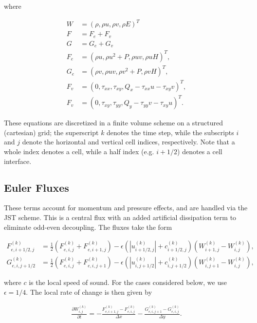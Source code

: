 \documentclass{article}
\begin{document}
where

\begin{equation}
\begin{aligned}
W &= (\rho, \rho u, \rho v, \rho E)^T \\
F &= F_e + F_v \\
G &= G_e + G_v \\
F_e &= (\rho u, \rho u^2 + P, \rho uv, \rho u H)^T, \\
G_e &= (\rho v, \rho uv, \rho v^2 + P, \rho v H)^T, \\
F_v &= (0, \tau_{xx}, \tau_{xy}, Q_x-\tau_{xx}u-\tau_{xy}v)^T, \\
F_v &= (0, \tau_{xy}, \tau_{yy}, Q_y-\tau_{yy}v-\tau_{xy}u)^T.
\end{aligned}
\end{equation}

These equations are discretized in a finite volume scheme on a structured (cartesian) grid; the superscript $k$ denotes the time step, while the subscripts $i$ and $j$ denote the horizontal and vertical cell indices, respectively. Note that a whole index denotes a cell, while a half index (e.g. $i+1/2$) denotes a cell interface.

\subsection{Euler Fluxes}
These terms account for momentum and pressure effects, and are handled via the JST scheme. This is a central flux with an added artificial dissipation term to eliminate odd-even decoupling. The fluxes take the form

\begin{equation}
\begin{aligned}
F_{e,i+1/2,j}^{(k)} &= \frac{1}{2}(F_{e,i,j}^{(k)}+F_{e,i+1,j}^{(k)}) - \epsilon(|u_{i+1/2,j}^{(k)}|+c_{i+1/2,j}^{(k)})(W_{i+1,j}^{(k)}-W_{i,j}^{(k)}), \\
G_{e,i,j+1/2}^{(k)} &= \frac{1}{2}(F_{e,i,j}^{(k)}+F_{e,i,j+1}^{(k)}) - \epsilon(|u_{i,j+1/2}^{(k)}|+c_{i,j+1/2}^{(k)})(W_{i,j+1}^{(k)}-W_{i,j}^{(k)}),
\end{aligned}
\end{equation}

where $c$ is the local speed of sound. For the cases considered below, we use $\epsilon = 1/4$. The local rate of change is then given by

\begin{equation}
\begin{aligned}
\frac{\partial W^{(k)}_{i,j}}{\partial t} = -\frac{F_{e,i+1,j}^{(k)}-F_{e,i,j}^{(k)}}{\Delta x} -\frac{G_{e,i,j+1}^{(k)}-G_{e,i,j}^{(k)}}{\Delta y}.
\end{aligned}
\end{equation}
\end{document}
